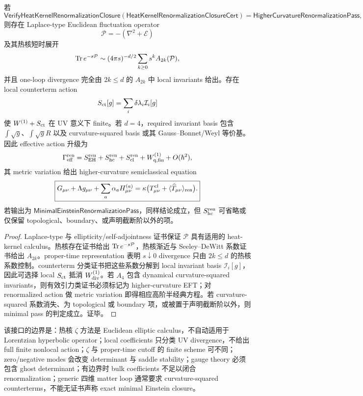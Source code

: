 \begin{theorem}[热核重整化闭包的可靠性]\label{thm:typed-address-biaxial-completion-heat-kernel-renormalization-closure-soundness}
若
\[
\mathsf{VerifyHeatKernelRenormalizationClosure}
(\mathsf{HeatKernelRenormalizationClosureCert})
=
\mathsf{HigherCurvatureRenormalizationPass},
\]
则存在 Laplace-type Euclidean fluctuation operator
\[
\mathcal P=-(\nabla^2+\mathcal E)
\]
及其热核短时展开
\[
{\rm Tr}\,e^{-s\mathcal P}
\sim
(4\pi s)^{-d/2}\sum_{k\ge0}s^kA_{2k}(\mathcal P),
\]
并且 one-loop divergence 完全由 \(2k\le d\) 的 \(A_{2k}\) 中 local invariants 给出。存在 local counterterm action
\[
S_{\rm ct}[g]=\sum_i\delta\lambda_i\mathcal I_i[g]
\]
使 \(W^{(1)}+S_{\rm ct}\) 在 UV 意义下 finite。若 \(d=4\)，required invariant basis 包含 \(\int\sqrt g\)、\(\int\sqrt g R\) 以及 curvature-squared basis 或其 Gauss--Bonnet/Weyl 等价基。因此 effective action 升级为
\[
\Gamma_{\rm eff}^{\rm ren}
=
S_{\rm EH}^{\rm ren}
+S_{\rm hc}^{\rm ren}
+S_{\rm cl}^{\rm ren}
+W_{\rm q,fin}^{(1)}
+O(\hbar^2),
\]
其 metric variation 给出 higher-curvature semiclassical equation
\[
\boxed{
G_{\mu\nu}
+\Lambda g_{\mu\nu}
+\sum_a\alpha_aH_{\mu\nu}^{(a)}
=
\kappa
\bigl(
T_{\mu\nu}^{\rm cl}
+\langle\widehat T_{\mu\nu}\rangle_{\rm ren}
\bigr).
}
\]
若输出为 \(\mathsf{MinimalEinsteinRenormalizationPass}\)，同样结论成立，但 \(S_{\rm hc}^{\rm ren}\) 可省略或仅保留 topological、boundary、或声明截断阶以外的项。
\end{theorem}
\begin{proof}
Laplace-type 与 ellipticity/self-adjointness 证书保证 \(\mathcal P\) 具有适用的 heat-kernel calculus。热核存在证书给出 \({\rm Tr}\,e^{-s\mathcal P}\)，热核渐近与 Seeley--DeWitt 系数证书给出 \(A_{2k}\)。proper-time representation 表明 \(s\downarrow0\) divergence 只由 \(2k\le d\) 的热核系数控制。counterterm 分类证书把这些系数分解到 local invariant basis \(\mathcal I_i[g]\)，因此可选择 local \(S_{\rm ct}\) 抵消 \(W_{\rm div}^{(1)}\)。若 \(A_4\) 包含 dynamical curvature-squared invariants，则有效引力类证书必须标记为 higher-curvature EFT；对 renormalized action 做 metric variation 即得相应高阶半经典方程。若 curvature-squared 系数消失、为 topological 或 boundary 项，或被置于声明截断阶以外，则 minimal pass 的判定成立。证毕。
\end{proof}

该接口的边界是：热核 \(\zeta\) 方法是 Euclidean elliptic calculus，不自动适用于 Lorentzian hyperbolic operator；local coefficients 只分类 UV divergence，不给出 full finite nonlocal action；\(\zeta\) 与 proper-time cutoff 的 finite scheme 可不同；zero/negative modes 会改变 determinant 与 saddle stability；gauge theory 必须包含 ghost determinant；有边界时 bulk coefficients 不足以闭合 renormalization；generic 四维 matter loop 通常要求 curvature-squared counterterms，不能无证书声称 exact minimal Einstein closure。
